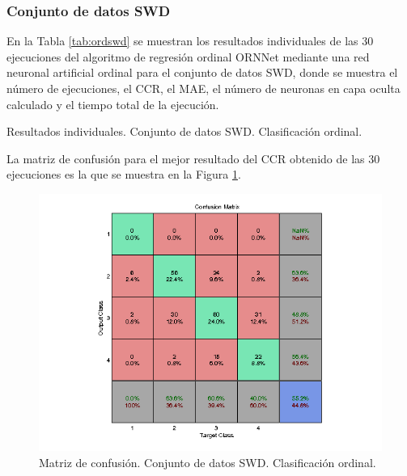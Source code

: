 			\subsubsection{Conjunto de datos SWD}
			
			En la Tabla \ref{tab:ordswd} se muestran los resultados individuales de las 30 ejecuciones del algoritmo de regresión ordinal ORNNet mediante una red neuronal artificial ordinal para el conjunto de datos SWD, donde se muestra el número de ejecuciones, el CCR, el MAE, el número de neuronas en capa oculta calculado y el tiempo total de la ejecución.\\
			
			\begin{table}[!htbp]
				\centering
				\caption{Resultados individuales. Conjunto de datos SWD. Clasificación ordinal.}
				\label{tab:ordswd}
			\end{table}
			
			La matriz de confusión para el mejor resultado del CCR obtenido de las 30 ejecuciones es la que se muestra en la Figura \ref{fig:ordswd}.
			
			\begin{figure}[htbp]
				\centering
				\includegraphics[scale=0.8]{../src/results/ordinal/SWD_mc1.png}
				\caption{Matriz de confusión. Conjunto de datos SWD. Clasificación ordinal.}
				\label{fig:ordswd}
			\end{figure}
			
